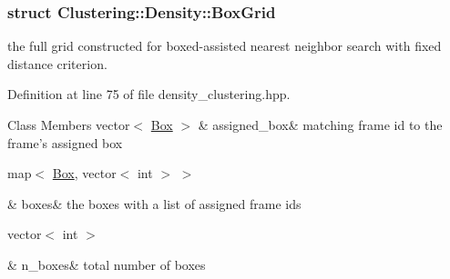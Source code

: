 \subsubsection{struct Clustering\-:\-:Density\-:\-:Box\-Grid}
the full grid constructed for boxed-\/assisted nearest neighbor search with fixed distance criterion. 

Definition at line 75 of file density\-\_\-clustering.\-hpp.

\begin{DoxyFields}{Class Members}
\hypertarget{namespaceClustering_1_1Density_afa7485c170c0de1020d9e0a2ae1c0887}{vector$<$ \hyperlink{namespaceClustering_1_1Density_a0ffd1a27b8195eaf74276ea91ef920ad}{Box} $>$}\label{namespaceClustering_1_1Density_afa7485c170c0de1020d9e0a2ae1c0887}
&
assigned\-\_\-box&
matching frame id to the frame's assigned box \\
\hline

\hypertarget{namespaceClustering_1_1Density_adc569c320ff9120fe361fb1398c692bb}{map$<$ \hyperlink{namespaceClustering_1_1Density_a0ffd1a27b8195eaf74276ea91ef920ad}{Box}, vector$<$ int $>$ $>$}\label{namespaceClustering_1_1Density_adc569c320ff9120fe361fb1398c692bb}
&
boxes&
the boxes with a list of assigned frame ids \\
\hline

\hypertarget{namespaceClustering_1_1Density_ac1f5ab2e679acbdec2e9d08a2a353059}{vector$<$ int $>$}\label{namespaceClustering_1_1Density_ac1f5ab2e679acbdec2e9d08a2a353059}
&
n\-\_\-boxes&
total number of boxes \\
\hline

\end{DoxyFields}


